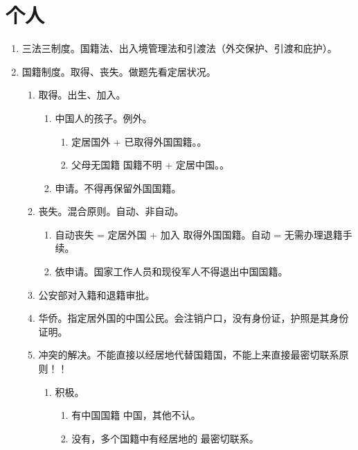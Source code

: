 \section{个人}
\begin{enumerate}
  \item 三法三制度。国籍法、出入境管理法和引渡法（外交保护、引渡和庇护）。
  \item 国籍制度。取得、丧失。做题先看定居状况。
        \begin{enumerate}
          \item 取得。出生、加入。
                \begin{enumerate}
                  \item 中国人的孩子。例外。
                        \begin{enumerate}
                          \item 定居国外 + 已取得外国国籍。。
                          \item 父母无国籍 \hz 国籍不明 + 定居中国。。
                        \end{enumerate}
                  \item 申请。不得再保留外国国籍。
                \end{enumerate}
          \item 丧失。混合原则。自动、非自动。
                \begin{enumerate}
                  \item 自动丧失 = 定居外国 + 加入 \hz 取得外国国籍。自动 = 无需办理退籍手续。
                  \item 依申请。国家工作人员和现役军人不得退出中国国籍。
                \end{enumerate}
          \item 公安部对入籍和退籍审批。
          \item 华侨。指定居外国的中国公民。会注销户口，没有身份证，护照是其身份证明。
          \item 冲突的解决。不能直接以经居地代替国籍国，不能上来直接最密切联系原则！！
                \begin{enumerate}
                  \item 积极。
                        \begin{enumerate}
                          \item 有中国国籍 \yjt 中国，其他不认。
                          \item 没有，多个国籍中有经居地的 \yjt 最密切联系。

\end{enumerate}
\end{enumerate}
\end{enumerate}
\end{enumerate}
